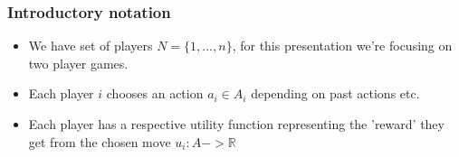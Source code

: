 \documentclass[aspectratio=169, handout]{beamer}
\begin{document}
\begin{frame}
  \frametitle{Introductory notation}
  \begin{itemize} 
      \item We have set of players $N =  \{1,...,n \}$, for this presentation we're focusing on two player games.
      \pause
      \item Each player $i$ chooses an action $a_i \in A_i$ depending on past actions etc.
      \pause
      \item Each player has a respective utility function representing the 'reward' they get from the chosen move $u_i : A -> \mathbb{R}$
  \end{itemize}

\end{frame}

\end{document}
